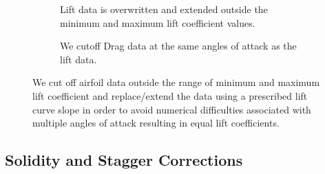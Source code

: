 \begin{figure}[htb]
     \centering
     \begin{subfigure}[t]{0.45\textwidth}
         \centering
        
        \caption{Lift data is overwritten and extended outside the minimum and maximum lift coefficient values.}
        \label{fig:liftstallcutoff}
     \end{subfigure}
     \hfill
     \begin{subfigure}[t]{0.45\textwidth}
         \centering
         
         \caption{We cutoff Drag data at the same angles of attack as the lift data.}
        \label{fig:dragstallcutoff}
     \end{subfigure}
        \caption{We cut off airfoil data outside the range of minimum and maximum lift coefficient and replace/extend the data using a prescribed lift curve slope in order to avoid numerical difficulties associated with multiple angles of attack resulting in equal lift coefficients.}
     \label{fig:stall-cutoff}
\end{figure}



\subsection{Solidity and Stagger Corrections}

